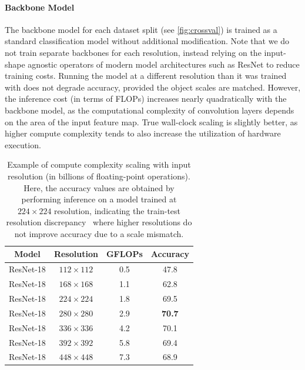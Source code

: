 \paragraph{Backbone Model}
The backbone model for each dataset split (see \autoref{fig:crossval}) is trained as a standard classification model without additional modification.
Note that we do not train separate backbones for each resolution, instead relying on the input-shape agnostic operators of modern model architectures such as ResNet to reduce training costs.
Running the model at a different resolution than it was trained with does not degrade accuracy, provided the object scales are matched.
However, the inference cost (in terms of FLOPs) increases nearly quadratically with the backbone model, as the computational complexity of convolution layers depends on the area of the input feature map.
True wall-clock scaling is slightly better, as higher compute complexity tends to also increase the utilization of hardware execution.
\begin{table}[]
    \centering
    \begin{tabular}{c|c|c|c}
       Model  & Resolution & GFLOPs & Accuracy  \\
    \hline
    ResNet-18 & $112\times112$ & 0.5 & 47.8\\ 
    ResNet-18 & $168\times168$ & 1.1 & 62.8\\ 
    ResNet-18 & $224\times224$ & 1.8 & 69.5\\ 
    ResNet-18 & $280\times280$ & 2.9 & \textbf{70.7}\\ 
    ResNet-18 & $336\times336$ & 4.2 & 70.1\\ 
    ResNet-18 & $392\times392$ & 5.8 & 69.4\\ 
    ResNet-18 & $448\times448$ & 7.3 & 68.9\\ 
    \end{tabular}
    \caption{Example of compute complexity scaling with input resolution (in billions of floating-point operations). Here, the accuracy values are obtained by performing inference on a model trained at $224\times224$ resolution, indicating the train-test resolution discrepancy~\cite{touvron2019fixing} where higher resolutions do not improve accuracy due to a scale mismatch. }
    \label{tab:my_label}
\end{table}

